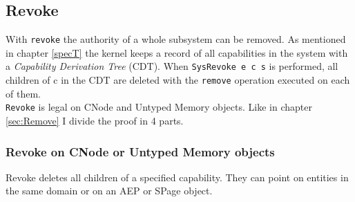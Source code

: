 \subsection{Revoke}\label{sec:Revoke}
With \texttt{revoke} the authority of a whole subsystem can be removed. As mentioned in chapter \ref{specT} the kernel keeps a record of all capabilities in the system with a \textit{Capability Derivation Tree} (CDT). When \texttt{SysRevoke e c s} is performed, all children of c in the CDT are deleted with the \texttt{remove} operation executed on each of them. \\
\texttt{Revoke} is legal on CNode and Untyped Memory objects. Like in chapter \ref{sec:Remove} I divide the proof in 4 parts. 
\subsubsection{Revoke on CNode or Untyped Memory objects} 
Revoke deletes all children of a specified capability. They can point on entities in the same domain or on an AEP or SPage object. 

